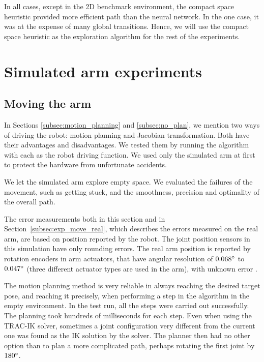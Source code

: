 \documentclass[buriama8_dp.tex]{subfiles}
\begin{document}
In all cases, except in the 2D benchmark environment, the compact space heuristic provided more efficient path than the neural network. In the one case, it was at the expense of many global transitions. Hence, we will use the compact space heuristic as the exploration algorithm for the rest of the experiments.


\section{Simulated arm experiments}
\label{sec:exp_sim_arm}

\subsection{Moving the arm}
\label{subsec:exp_move_sim}

In Sections \ref{subsec:motion_planning} and \ref{subsec:no_plan}, we mention two ways of driving the robot: motion planning and Jacobian transformation. Both have their advantages and disadvantages. We tested them by running the algorithm with each as the robot driving function. We used only the simulated arm at first to protect the hardware from unfortunate accidents.

We let the simulated arm explore empty space. We evaluated the failures of the movement, such as getting stuck, and the smoothness, precision and optimality of the overall path.

The error measurements both in this section and in Section~\ref{subsec:exp_move_real}, which describes the errors measured on the real arm, are based on position reported by the robot. The joint position sensors in this simulation have only rounding errors. The real arm position is reported by rotation encoders in arm actuators, that have angular resolution of \(0.068^\circ\) to \(0.047^\circ\) (three different actuator types are used in the arm), with unknown error \cite{jaco_joint_spec}.

The motion planning method is very reliable in always reaching the desired target pose, and reaching it precisely, when performing a step in the algorithm in the empty environment. In the test run, all the steps were carried out successfully. The planning took hundreds of milliseconds for each step. Even when using the TRAC-IK solver, sometimes a joint configuration  very different from the current one was found as the IK solution by the solver. The planner then had no other option than to plan a more complicated path, perhaps rotating the first joint by \(180^\circ\).
\end{document}
